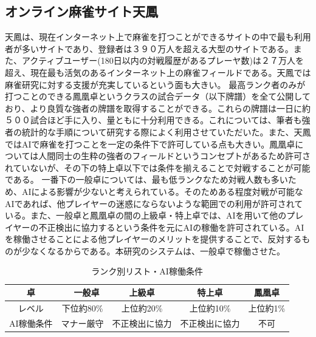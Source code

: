 \subsection{オンライン麻雀サイト天鳳}
天鳳は、現在インターネット上で麻雀を打つことができるサイトの中で最も利用者が多いサイトであり、登録者は３９０万人を超える大型のサイトである。また、アクティブユーザー(180日以内の対戦履歴があるプレーヤ数)は２７万人を超え、現在最も活気のあるインターネット上の麻雀フィールドである。天鳳では麻雀研究に対する支援が充実しているという面も大きい。
最高ランク者のみが打つことのできる鳳凰卓というクラスの試合データ（以下牌譜）を全て公開しており、より良質な強者の牌譜を取得することができる。これらの牌譜は一日に約５００試合ほど手に入り、量ともに十分利用できる。これについては、筆者も強者の統計的な手順について研究する際によく利用させていただいた。また、天鳳ではAIで麻雀を打つことを一定の条件下で許可している点も大きい。鳳凰卓については人間同士の生粋の強者のフィールドというコンセプトがあるため許可されていないが、その下の特上卓以下では条件を揃えることで対戦することが可能である。
一番下の一般卓については、最も低ランクなため対戦人数も多いため、AIによる影響が少ないと考えられている。そのためある程度対戦が可能なAIであれば、他プレイヤーの迷惑にならないような範囲での利用が許可されている。また、一般卓と鳳凰卓の間の上級卓・特上卓では、AIを用いて他のプレイヤーの不正検出に協力するという条件を元にAIの稼働を許可されている。AIを稼働させることによる他プレイヤーのメリットを提供することで、反対するものが少なくなるからである。本研究のシステムは、一般卓で稼働させた。

\begin{table}[h]
  \caption{ランク別リスト・AI稼働条件}
  \label{tb:rate2231}
  \begin{center}
  \begin{tabular}{c|c|c|c|c}
    \hline
    卓　&　一般卓   & 上級卓 & 特上卓 & 鳳凰卓\\\hline\hline
    レベル & 下位約80\% & 上位約20\% & 上位約10\% & 上位約1\% \\\hline
    AI稼働条件 & マナー厳守 & 不正検出に協力 & 不正検出に協力 & 不可\\\hline
  \end{tabular}\end{center}
\end{table}


